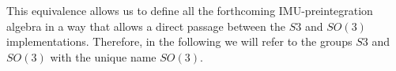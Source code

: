 %

This equivalence
allows us to define all the forthcoming IMU-preintegration algebra in a way that allows a direct passage between the $S3$ and $SO(3)$ implementations.
Therefore, in the following we will refer to the groups $S3$ and $SO(3)$ with the unique name $SO(3)$. 





